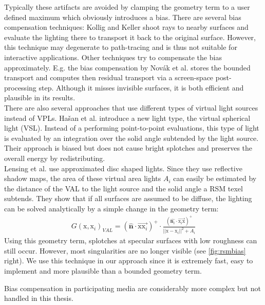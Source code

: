 \documentclass[thesis.tex]{subfiles}
\begin{document}
Typically these artifacts are avoided by clamping the geometry term to a user defined maximum which obviously introduces a bias.
There are several bias compensation techniques:
Kollig and Keller \cite{bib:biascomp:kk04} shoot rays to nearby surfaces and evaluate the lighting there to transport it back to the original surface.
However, this technique may degenerate to path-tracing and is thus not suitable for interactive applications.
Other techniques try to compensate the bias approximately.
E.g. the bias compensation by Nov\'{a}k et al. \cite{bib:biascomp:novak11} stores the bounded transport and computes then residual transport via a screen-space post-processing step.
Although it misses invisible surfaces, it is both efficient and plausible in its results.
\\
There are also several approaches that use different types of virtual light sources instead of VPLs.
Ha{\v{s}}an et al. \cite{bib:biascomp:vsl} introduce a new light type, the virtual spherical light (VSL).
Instead of a performing point-to-point evaluations, this type of light is evaluated by an integration over the solid angle subtended by the light source.
Their approach is biased but does not cause bright splotches and preserves the overall energy by redistributing.
\\
Lensing et al. \cite{bib:LightskinPaper} use approximated disc shaped lights.
Since they use reflective shadow maps, the area of these virtual area lights $A_{i}$ can easily be estimated by the distance of the VAL to the light source and the solid angle a RSM texel subtends.
They show that if all surfaces are assumed to be diffuse, the lighting can be solved analytically by a simple change in the geometry term:
\begin{align}
G(\mathrm{x}, \mathrm{x}_i)_{VAL} = (\hat{\mathbf{n}} \cdot \overrightarrow{\mathrm{x}\mathrm{x}_i})^+ \cdot \frac{(\hat{\mathbf{n}_i} \cdot \overrightarrow{\mathrm{x}_i\mathrm{x}} )^+}{||\mathrm{x} - \mathrm{x}_i||^2 + A_{i}}
\end{align}
Using this geometry term, splotches at specular surfaces with low roughness can still occur.
However, most singularities are no longer visible (see \autoref{fig:rsmbias} right).
We use this technique in our approach since it is extremely fast, easy to implement and more plausible than a bounded geometry term.

Bias compensation in participating media are considerably more complex but not handled in this thesis.
\end{document}
